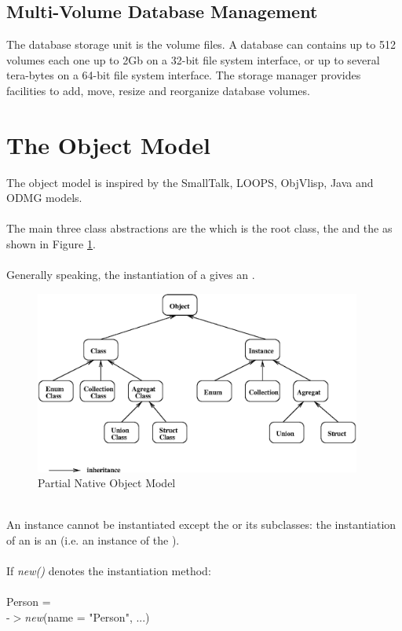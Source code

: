 \subsection{Multi-Volume Database Management}
The database storage unit is the volume files. A database can contains
up to 512 volumes each one up to 2Gb on a 32-bit file system interface,
or up to several tera-bytes on a 64-bit file system interface.
The storage manager provides facilities to add, move, resize and reorganize
database volumes.
\section{The Object Model}
The \eyedb object model is inspired by the SmallTalk, LOOPS, ObjVlisp, Java
and ODMG models.
\\
\\
The main three class abstractions are the  which is
the root class, the  and the  as shown in
Figure \ref{objmod}.
\\
\\
Generally speaking, the instantiation of a  gives an .
\begin{figure}[!th]
\centering
\includegraphics[height=60mm]{figures/objmod.eps}
\caption{Partial Native Object Model}
\label{objmod}
\end{figure}
\\
An instance cannot be instantiated except the  or its
subclasses: the instantiation of an  is an 
(i.e. an instance of the ).
\\
\\
If \emph{new()} denotes the instantiation method:
\\
\\
\ixx{} \textsf{Person} =\\
\ixy  {}-$>$\emph{new}(name = "Person", ...)
